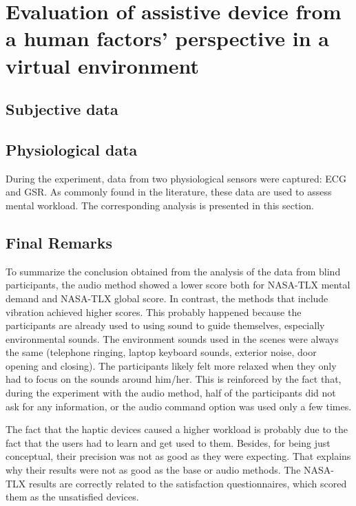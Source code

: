 \section{Evaluation of assistive device from a human factors' perspective in a virtual environment}
\label{sec:results_obj_1}

\subsection{Subjective data}




\subsection{Physiological data}

During the experiment, data from two physiological sensors were captured: ECG and GSR. As commonly found in the literature, these data are used to assess mental workload. The corresponding analysis is presented in this section.




\subsection{Final Remarks}

To summarize the conclusion obtained from the analysis of the data from blind participants, the audio method showed a lower score both for NASA-TLX mental demand and NASA-TLX global score. In contrast, the methods that include vibration achieved higher scores. This probably happened because the participants are already used to using sound to guide themselves, especially environmental sounds. The environment sounds used in the scenes were always the same (telephone ringing, laptop keyboard sounds, exterior noise, door opening and closing). The participants likely felt more relaxed when they only had to focus on the sounds around him/her. This is reinforced by the fact that, during the experiment with the audio method, half of the participants did not ask for any information, or the audio command option was used only a few times.

The fact that the haptic devices caused a higher workload is probably due to the fact that the users had to learn and get used to them. Besides, for being just conceptual, their precision was not as good as they were expecting. That explains why their results were not as good as the base or audio methods. The NASA-TLX results are correctly related to the satisfaction questionnaires, which scored them as the unsatisfied devices.

